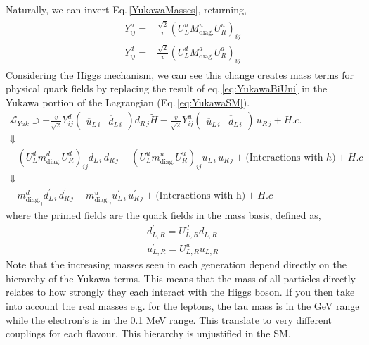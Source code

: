 Naturally, we can invert Eq.\,\ref{YukawaMasses}, returning, 
\begin{align}
\label{eq:YukawaBiUni}
\begin{split}
Y^u_{ij} = & \frac{\sqrt{2}}{v} (U_L^u M^u_{\text{diag.}} U_R^u)_{ij} \\
Y^d_{ij} = & \frac{\sqrt{2}}{v} (U_L^d M^d_{\text{diag.}} U_R^d)_{ij}
\end{split}
\end{align}
%
Considering the Higgs mechanism, we can see this change creates mass terms for physical quark fields by replacing the result of eq.\,\ref{eq:YukawaBiUni} in the Yukawa portion of the Lagrangian (Eq.\,\ref{eq:YukawaSM}).
%
\begin{gather}
\mathcal{L}_{Yuk} \supset 
- \frac{v}{\sqrt{2}} Y^d_{ij} \begin{pmatrix} \overline{u}_{L\,i} & \overline{d}_{L\,i}  \end{pmatrix}  d_{R\,j} \tilde{H}
%
-\frac{v}{\sqrt{2}} Y^u_{ij} \begin{pmatrix} \overline{u}_{L\,i} & \overline{d}_{L\,i}  \end{pmatrix} \, u_{R\,j} + H.c. \nonumber  \\ 
 \Downarrow \nonumber \\
-(U_L^d m^d_{\text{diag.}} U_R^d)_{ij} d_{L\,i} \, d_{R\,j}  - (U_L^u m^u_{\text{diag.}} U_R^u)_{ij} u_{L\,i} \, u_{R\,j} + \big(\text{Interactions with } h\big) + H.c \\ 
 \Downarrow  \nonumber \\ 
-m^d_{\text{diag.}_j} d_{L\,i}^\prime \, d_{R\,j}^\prime  - m^u_{\text{diag.}_j} u_{L\,i}^\prime \, u_{R\,j}^\prime + \big(\text{Interactions with h}\big) + H.c  \nonumber  
\end{gather}
%
where the primed fields are the quark fields in the mass basis, defined as, 
\begin{equation}
\begin{split}
d^\prime_{L,R} = U^d_{L,R} d_{L,R} \\
u^\prime_{L,R} = U^u_{L,R} u_{L,R} 
\end{split}  
\end{equation}
% 
Note that the increasing masses seen in each generation depend directly on the  hierarchy of the Yukawa terms. This means that the mass of all particles directly relates to how strongly they each interact with the Higgs boson.
%
If you then take into account the real masses e.g. for the leptons, the tau mass is in the GeV range while the electron's is in the 0.1 MeV range. This translate to very different couplings for each flavour. 
%
This hierarchy is unjustified in the SM. 

